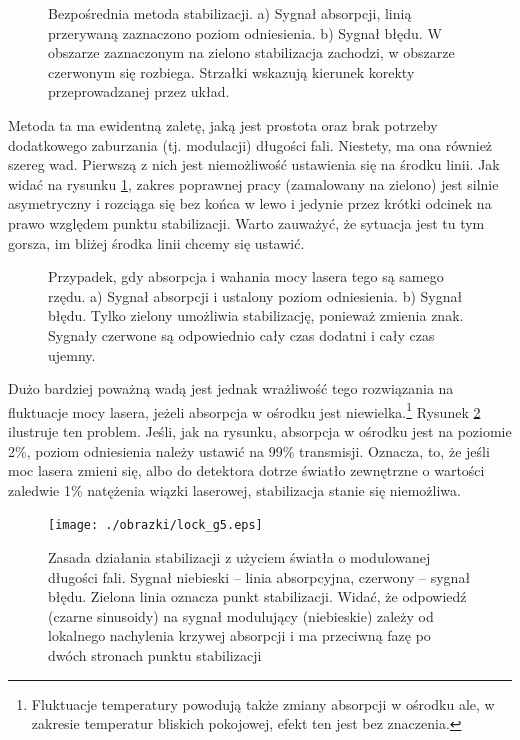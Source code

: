 \documentclass[a4paper,10pt,twoside]{article}
\begin{document}
\begin{figure}[h!]
\caption{Bezpośrednia metoda stabilizacji. a) Sygnał absorpcji, linią przerywaną zaznaczono poziom odniesienia. b) Sygnał błędu. W obszarze zaznaczonym na zielono stabilizacja zachodzi, w obszarze czerwonym się rozbiega. Strzałki wskazują kierunek korekty przeprowadzanej przez układ.}
\label{fig:lock1}
\end{figure} 

Metoda ta ma ewidentną zaletę, jaką jest prostota oraz brak potrzeby dodatkowego zaburzania (tj. modulacji) długości fali.
Niestety, ma ona również szereg wad. Pierwszą z nich jest niemożliwość ustawienia się na środku linii. Jak widać na
rysunku \ref{fig:lock1}, zakres poprawnej pracy (zamalowany na zielono) jest silnie asymetryczny i rozciąga się 
bez końca w lewo i jedynie przez krótki odcinek na prawo względem punktu stabilizacji. Warto zauważyć, że sytuacja jest tu tym gorsza, im
bliżej środka linii chcemy się ustawić.

\begin{figure}[h!]
\caption{Przypadek, gdy absorpcja i wahania mocy lasera tego są samego rzędu. a) Sygnał absorpcji i ustalony poziom odniesienia. b) Sygnał błędu. Tylko zielony umożliwia stabilizację, ponieważ zmienia znak. Sygnały czerwone są odpowiednio cały czas dodatni i cały czas ujemny. }
\label{fig:lock2}
\end{figure} 


Dużo bardziej poważną wadą jest jednak wrażliwość tego rozwiązania na fluktuacje mocy lasera, jeżeli absorpcja w ośrodku jest niewielka.\footnote{Fluktuacje temperatury powodują także zmiany absorpcji w ośrodku ale, w zakresie temperatur bliskich pokojowej, efekt ten jest bez znaczenia.} 
Rysunek \ref{fig:lock2} ilustruje ten problem. Jeśli, jak na rysunku, absorpcja w ośrodku jest na poziomie 2\%, poziom odniesienia
należy ustawić na 99\% transmisji. Oznacza, to, że jeśli moc lasera zmieni się, albo do detektora dotrze światło zewnętrzne o wartości
zaledwie 1\% natężenia wiązki laserowej, stabilizacja stanie się niemożliwa.

\begin{figure}

\texttt{[image: ./obrazki/lock\_g5.eps]}
\caption{Zasada działania stabilizacji z użyciem światła o modulowanej długości fali. Sygnał niebieski -- linia absorpcyjna, czerwony -- sygnał błędu. Zielona linia oznacza punkt stabilizacji. Widać, że odpowiedź (czarne sinusoidy) na sygnał modulujący (niebieskie) zależy od lokalnego nachylenia krzywej absorpcji i ma przeciwną fazę po dwóch stronach punktu stabilizacji}
\label{fig:lock3}
\end{figure} 
\end{document}
